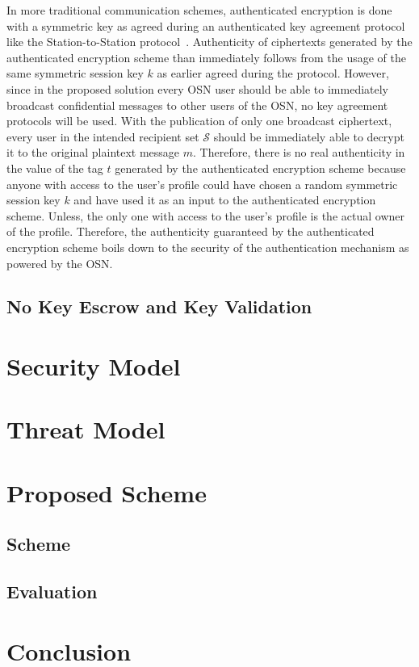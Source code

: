 In more traditional communication schemes, authenticated encryption is done with a symmetric key as agreed during an authenticated key agreement protocol like the Station-to-Station protocol~\cite{art:DiffieOW92}. Authenticity of ciphertexts generated by the authenticated encryption scheme than immediately follows from the usage of the same symmetric session key $k$ as earlier agreed during the protocol. However, since in the proposed solution every OSN user should be able to immediately broadcast confidential messages to other users of the OSN, no key agreement protocols will be used. With the publication of only one broadcast ciphertext, every user in the intended recipient set $\mathcal{S}$ should be immediately able to decrypt it to the original plaintext message $m$. Therefore, there is no real authenticity in the value of the tag $t$ generated by the authenticated encryption scheme because anyone with access to the user's profile could have chosen a random symmetric session key $k$ and have used it as an input to the authenticated encryption scheme. Unless, the only one with access to the user's profile is the actual owner of the profile. Therefore, the authenticity guaranteed by the authenticated encryption scheme boils down to the security of the authentication mechanism as powered by the OSN.


\subsection{No Key Escrow and Key Validation}
\section{Security Model}


\section{Threat Model}

\section{Proposed Scheme}

\subsection{Scheme}

\subsection{Evaluation}

\section{Conclusion}

